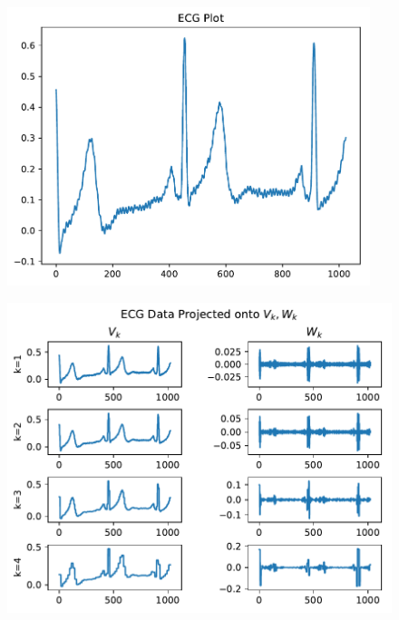\documentclass[12pt,twoside]{article}
\begin{document}
\begin{enumerate}
\begin{enumerate}
\begin{figure}[H]
		\centering
		\captionsetup{justification=centering}
        		\includegraphics[width=300pt]{code/haar1d/ecg.pdf}
	\end{figure}
	\begin{figure}[H]
		\centering
		\captionsetup{justification=centering}
        		\includegraphics[width=400pt]{code/haar1d/ecg_project.pdf}
	\end{figure}
	\begin{figure}[H]
		\centering
		\captionsetup{justification=centering}

\end{figure}
\end{enumerate}
\end{enumerate}
\end{document}
